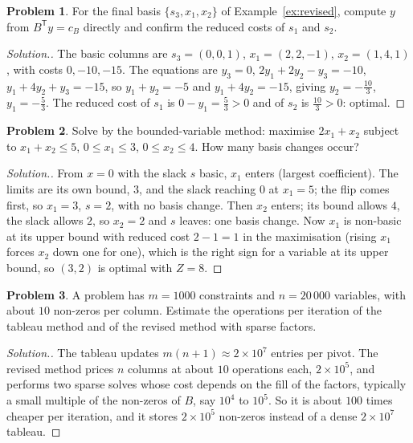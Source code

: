 \documentclass[11pt,a4paper]{article}
\numberwithin{equation}{section}
\theoremstyle{definition}
\newtheorem{problemx}{Problem}[subsection]
\newenvironment{problem}{\begin{problemx}}{\end{problemx}}
\newenvironment{solution}
  {\renewcommand{\qedsymbol}{}\begin{proof}[\textit{Solution}.]}
  {\end{proof}}
\begin{document}
\begin{problem}
For the final basis $\{s_3, x_1, x_2\}$ of Example~\ref{ex:revised}, compute $y$ from $B^{\mathsf T}y = c_B$ directly and confirm the reduced costs of $s_1$ and $s_2$.
\end{problem}

\begin{solution}
The basic columns are $s_3 = (0, 0, 1)$, $x_1 = (2, 2, -1)$, $x_2 = (1, 4, 1)$, with costs $0, -10, -15$. The equations are $y_3 = 0$, $2y_1 + 2y_2 - y_3 = -10$, $y_1 + 4y_2 + y_3 = -15$, so $y_1 + y_2 = -5$ and $y_1 + 4y_2 = -15$, giving $y_2 = -\frac{10}3$, $y_1 = -\frac53$. The reduced cost of $s_1$
is $0 - y_1 = \frac53 > 0$ and of $s_2$ is $\frac{10}3 > 0$: optimal.
\end{solution}

\begin{problem}
Solve by the bounded-variable method: maximise $2x_1 + x_2$ subject to $x_1 + x_2 \leq 5$, $0 \leq x_1 \leq 3$, $0 \leq x_2 \leq 4$. How many basis changes occur?
\end{problem}

\begin{solution}
From $x = 0$ with the slack $s$ basic, $x_1$ enters (largest coefficient). The limits are its own bound, $3$, and the slack reaching $0$ at $x_1 = 5$; the flip comes first, so $x_1 = 3$, $s = 2$, with no basis change. Then $x_2$ enters; its bound allows $4$, the slack allows $2$, so $x_2 = 2$ and $s$ leaves: one basis
change. Now $x_1$ is non-basic at its upper bound with reduced cost $2 - 1 = 1$ in the maximisation (rising $x_1$ forces $x_2$ down one for one), which is the right sign for a variable at its upper bound, so $(3, 2)$ is optimal with $Z = 8$.
\end{solution}

\begin{problem}
A problem has $m = 1000$ constraints and $n = 20\,000$ variables, with about $10$ non-zeros per column. Estimate the operations per iteration of the tableau method and of the revised method with sparse factors.
\end{problem}

\begin{solution}
The tableau updates $m(n + 1) \approx 2 \times 10^7$ entries per pivot. The revised method prices $n$ columns at about $10$ operations each, $2 \times 10^5$, and performs two sparse solves whose cost depends on the fill of the factors, typically a small multiple of the non-zeros of $B$, say $10^4$ to $10^5$. So it is about
$100$ times cheaper per iteration, and it stores $2 \times 10^5$ non-zeros instead of a dense $2 \times 10^7$ tableau.
\end{solution}
\end{document}

